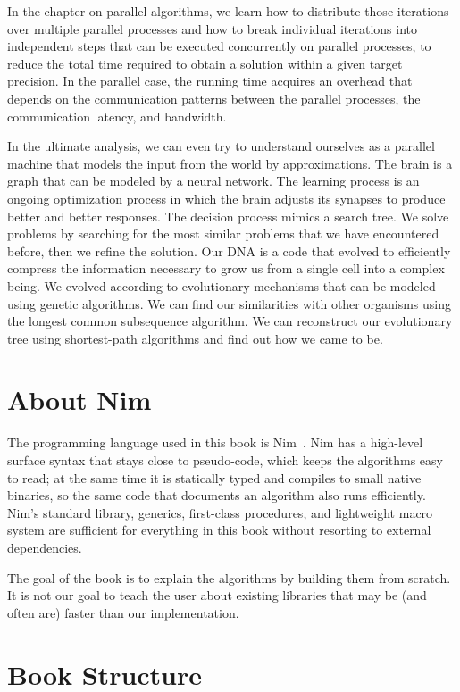 \documentclass[justified, sixbynine]{tufte-book}
\theoremstyle{plain}%
\newtheorem * {corollary}{Corollary}
\theoremstyle{definition}
\theoremstyle{remark}
\newtheorem * {remark}{Remark}
\newtheorem * {note}{Note}
\begin{document}
\begin{fullwidth}
In the chapter on parallel algorithms, we learn how to distribute those iterations over multiple parallel processes and how to break individual iterations into independent steps that can be executed concurrently on parallel processes, to reduce the total time required to obtain a solution within a given target precision. In the parallel case, the running time acquires an overhead that depends on the communication patterns between the parallel processes, the communication latency, and bandwidth.

In the ultimate analysis, we can even try to understand ourselves as a parallel machine that models the input from the world by approximations. The brain is a graph that can be modeled by a neural network. The learning process is an ongoing optimization process in which the brain adjusts its synapses to produce better and better responses. The decision process mimics a search tree. We solve problems by searching for the most similar problems that we have encountered before, then we refine the solution. Our DNA is a code that evolved to efficiently compress the information necessary to grow us from a single cell into a complex being. We evolved according to evolutionary mechanisms that can be modeled using genetic algorithms. We can find our similarities with other organisms using the longest common subsequence algorithm. We can reconstruct our evolutionary tree using shortest-path algorithms and find out how we came to be.

\section{About Nim}

The programming language used in this book is Nim~\cite{nim}. Nim has a high-level surface syntax that stays close to pseudo-code, which keeps the algorithms easy to read; at the same time it is statically typed and compiles to small native binaries, so the same code that documents an algorithm also runs efficiently. Nim's standard library, generics, first-class procedures, and lightweight macro system are sufficient for everything in this book without resorting to external dependencies.

The goal of the book is to explain the algorithms by building them from scratch. It is not our goal to teach the user about existing libraries that may be (and often are) faster than our implementation.

\section{Book Structure}


\end{fullwidth}
\end{document}
